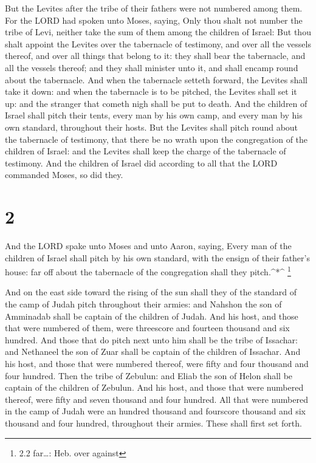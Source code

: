  But the Levites after the tribe of their fathers were not
numbered among them.  For the LORD had spoken unto Moses,
saying,  Only thou shalt not number the tribe of Levi,
neither take the sum of them among the children of Israel: 
But thou shalt appoint the Levites over the tabernacle of testimony, and
over all the vessels thereof, and over all things that belong to it:
they shall bear the tabernacle, and all the vessels thereof; and they
shall minister unto it, and shall encamp round about the tabernacle.
 And when the tabernacle setteth forward, the Levites shall
take it down: and when the tabernacle is to be pitched, the Levites
shall set it up: and the stranger that cometh nigh shall be put to
death.  And the children of Israel shall pitch their tents,
every man by his own camp, and every man by his own standard, throughout
their hosts.  But the Levites shall pitch round about the
tabernacle of testimony, that there be no wrath upon the congregation of
the children of Israel: and the Levites shall keep the charge of the
tabernacle of testimony.  And the children of Israel did
according to all that the LORD commanded Moses, so did they.

\hypertarget{section-1}{%
\section{2}\label{section-1}}

 And the LORD spake unto Moses and unto Aaron, saying,
 Every man of the children of Israel shall pitch by his own
standard, with the ensign of their father's house: far off about the
tabernacle of the congregation shall they pitch.\^{}*\^{} \footnote{2.2
  far\ldots: Heb. over against}

 And on the east side toward the rising of the sun shall
they of the standard of the camp of Judah pitch throughout their armies:
and Nahshon the son of Amminadab shall be captain of the children of
Judah.  And his host, and those that were numbered of them,
were threescore and fourteen thousand and six hundred.  And
those that do pitch next unto him shall be the tribe of Issachar: and
Nethaneel the son of Zuar shall be captain of the children of Issachar.
 And his host, and those that were numbered thereof, were
fifty and four thousand and four hundred.  Then the tribe of
Zebulun: and Eliab the son of Helon shall be captain of the children of
Zebulun.  And his host, and those that were numbered
thereof, were fifty and seven thousand and four hundred. 
All that were numbered in the camp of Judah were an hundred thousand and
fourscore thousand and six thousand and four hundred, throughout their
armies. These shall first set forth.

